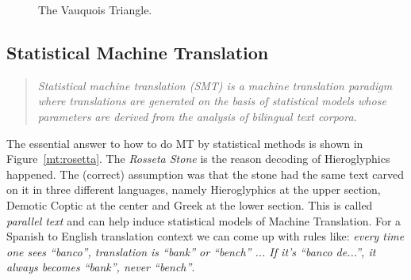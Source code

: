 \documentclass[a4paper,10pt]{report}
\begin{document}
\begin{figure}[ht]
{
}
\caption{The Vauquois Triangle.}
\label{mt:vauquois}
\end{figure}

\subsection*{Statistical Machine Translation}

\begin{quotation}
 \textit{Statistical machine translation (SMT) is a machine translation paradigm where translations are generated on the basis of statistical models whose parameters are derived from the analysis of bilingual text corpora.}
\end{quotation}

The essential answer to how to do MT by statistical methods is shown in Figure~\ref{mt:rosetta}. The \emph{Rosseta Stone} is the reason decoding of Hieroglyphics happened. The (correct) assumption was that the stone had the same text carved on it in three different languages, namely Hieroglyphics at the upper section, Demotic Coptic at the center and Greek at the lower section. This is called \emph{parallel text} and can help induce statistical models of Machine Translation. For a Spanish to English translation context we can come up with rules like: \textit{every time one sees ``banco'', translation is ``bank'' or ``bench'' ... If it’s ``banco de...'', it always becomes ``bank'', never ``bench''}.
\end{document}
